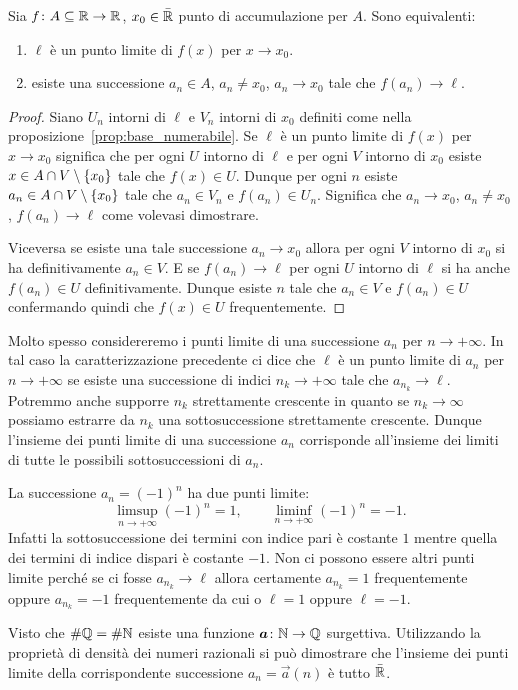 \begin{proposition}
  Sia $f\colon A\subseteq {\mathbb R}\to {\mathbb R}$, $x_0\in \bar {{\mathbb R}}$ 
  punto di accumulazione per $A$. 
  Sono equivalenti:
  \begin{enumerate}
    \item $\ell$ è un punto limite di $f(x)$ per $x\to x_0$.
    \item esiste una successione $a_n\in A$, $a_n\neq x_0$, $a_n\to x_0$ 
    tale che $f(a_n)\to \ell$.
  \end{enumerate}
\end{proposition}
%
\begin{proof}
  Siano $U_n$ intorni di $\ell$ e $V_n$ intorni di $x_0$ definiti 
  come nella proposizione~\ref{prop:base_numerabile}.
  Se $\ell$ è un punto limite di $f(x)$ per $x\to x_0$ 
  significa che per ogni $U$ intorno di $\ell$ e per ogni $V$ 
  intorno di $x_0$ esiste $x\in A\cap V\setminus{\left\{ x_0 \right\}}$ 
  tale che $f(x)\in U$.
  Dunque per ogni $n$ esiste $a_n\in A \cap V\setminus{\left\{ x_0 \right\}}$ 
  tale che $a_n\in V_n$ e $f(a_n)\in U_n$. 
  Significa che $a_n\to x_0$, $a_n\neq x_0$, $f(a_n)\to \ell$ 
  come volevasi dimostrare.
  
  Viceversa se esiste una tale successione $a_n\to x_0$ allora 
  per ogni $V$ intorno di $x_0$ si ha definitivamente $a_n\in V$.
  E se $f(a_n)\to \ell$ per ogni $U$ intorno di $\ell$
  si ha anche $f(a_n)\in U$ definitivamente.
  Dunque esiste $n$ tale che $a_n\in V$ e $f(a_n)\in U$ confermando 
  quindi che $f(x)\in U$ frequentemente. 
\end{proof}

Molto spesso considereremo i punti limite di una successione $a_n$
per $n\to +\infty$.
In tal caso la caratterizzazione precedente ci dice che $\ell$ 
è un punto limite di $a_n$ per $n\to+\infty$ se esiste 
una successione di indici $n_k\to+\infty$ tale che $a_{n_k}\to \ell$.
Potremmo anche supporre $n_k$ strettamente crescente in quanto se 
$n_k\to \infty$ possiamo estrarre da $n_k$ una sottosuccessione 
strettamente crescente. 
Dunque l'insieme dei punti limite di una successione $a_n$ 
corrisponde all'insieme dei limiti di tutte le possibili 
sottosuccessioni di $a_n$.

\begin{example}
  La successione $a_n=(-1)^n$ ha due punti limite:
  \[
    \limsup_{n\to +\infty}(-1)^n = 1, \qquad \liminf_{n\to+\infty} (-1)^n = -1.
  \]
  Infatti la sottosuccessione dei termini con indice pari è costante $1$ mentre
  quella dei termini di indice dispari è costante $-1$.
  Non ci possono essere altri punti limite perché se ci fosse $a_{n_k}\to \ell$
  allora certamente $a_{n_k}=1$ frequentemente oppure $a_{n_k}=-1$
  frequentemente da cui o $\ell=1$ oppure $\ell=-1$.
\end{example}
%
\begin{example}
  Visto che $\#{\mathbb Q}=\#{\mathbb N}$ esiste una funzione $\boldsymbol a \colon {\mathbb N} \to {\mathbb Q}$
  surgettiva. Utilizzando la proprietà di densità dei numeri razionali
  si può dimostrare che l'insieme dei punti limite della corrispondente successione
  $a_n = \vec a(n)$ è tutto $\bar {{\mathbb R}}$.
\end{example}

